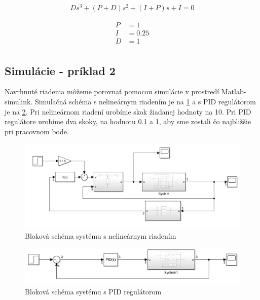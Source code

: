\documentclass[../main.tex]{subfiles}
\begin{document}
\begin{equation}
		\begin{aligned}
		Ds^3+(P+D)s^2+(I+P)s+I=0
		\end{aligned}
		\label{eqn:svlvs2_nasaURO}
	\end{equation}

\begin{equation}
		\begin{aligned}
		P &= 1 						\\
		I &= 0.25 						\\
		D &= 1						 \\
		\end{aligned}
		\label{eqn:svlvs2_parametrePID}
	\end{equation}

\newpage
\subsection*{Simulácie - príklad 2}

Navrhnuté riadenia môžeme porovnať pomocou simulácie v prostredí Matlab-simulink. Simulačná schéma s nelineárnym riadením je na \cref{fig:svlvs2_modelRiadenia} a s PID regulátorom je na \cref{fig:svlvs2_modelRiadeniaPID}. Pri nelineárnom riadení urobíme skok žiadanej hodnoty na 10. Pri PID regulátore urobime dva skoky, na hodnotu 0.1 a 1, aby sme zostali čo najbližšie pri pracovnom bode.

	\begin{figure}[h!]
		\centering
		\includegraphics[width=0.8\linewidth]{ModelRiadenia}
		\caption{Bloková schéma systému s nelineárnym riadením}
		\label{fig:svlvs2_modelRiadenia}
	\end{figure}


	\begin{figure}[h!]
		\centering
		\includegraphics[width=0.8\linewidth]{ModelRiadeniaPID}
		\caption{Bloková schéma systému s PID regulátorom}
		\label{fig:svlvs2_modelRiadeniaPID}
	\end{figure}
\end{document}

